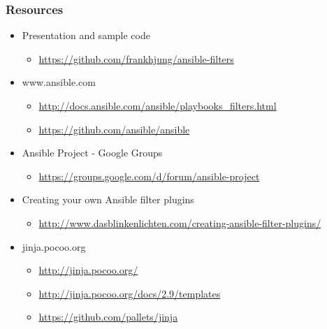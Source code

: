 \documentclass[pdf]{beamer}
\begin{document}
\begin{frame}
  \frametitle{Resources}
  \begin{itemize}
    \item[] Presentation and sample code
      \begin{itemize}
        \item \scriptsize \url{https://github.com/frankhjung/ansible-filters}
      \end{itemize}
    \item[] www.ansible.com
      \begin{itemize}
        \item \scriptsize \url{http://docs.ansible.com/ansible/playbooks_filters.html}
        \item \scriptsize \url{https://github.com/ansible/ansible}
      \end{itemize}
    \item[] Ansible Project - Google Groups
      \begin{itemize}
        \item \scriptsize \url{https://groups.google.com/d/forum/ansible-project}
      \end{itemize}
    \item[] Creating your own Ansible filter plugins
      \begin{itemize}
        \item \scriptsize \url{http://www.dasblinkenlichten.com/creating-ansible-filter-plugins/}
      \end{itemize}
    \item[] jinja.pocoo.org
      \begin{itemize}
        \item \scriptsize \url{http://jinja.pocoo.org/}
        \item \scriptsize \url{http://jinja.pocoo.org/docs/2.9/templates}
        \item \scriptsize \url{https://github.com/pallets/jinja}
      \end{itemize}
  \end{itemize}
\end{frame}
\end{document}
